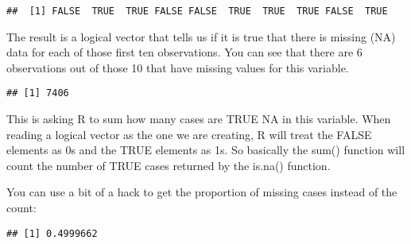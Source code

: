 \documentclass[
]{book}
\newenvironment{Shaded}{\begin{snugshade}}{\end{snugshade}}
\newcommand{\DecValTok}[1]{\textcolor[rgb]{0.00,0.00,0.81}{#1}}
\newcommand{\FunctionTok}[1]{\textcolor[rgb]{0.13,0.29,0.53}{\textbf{#1}}}
\newcommand{\NormalTok}[1]{#1}
\newcommand{\SpecialCharTok}[1]{\textcolor[rgb]{0.81,0.36,0.00}{\textbf{#1}}}
\begin{document}
\begin{Shaded}
\end{Shaded}

\begin{verbatim}
##  [1] FALSE  TRUE  TRUE FALSE FALSE  TRUE  TRUE  TRUE FALSE  TRUE
\end{verbatim}

The result is a logical vector that tells us if it is true that there is missing (NA) data for each of those first ten observations. You can see that there are 6 observations out of those 10 that have missing values for this variable.

\begin{Shaded}
\end{Shaded}

\begin{verbatim}
## [1] 7406
\end{verbatim}

This is asking R to sum how many cases are TRUE NA in this variable. When reading a logical vector as the one we are creating, R will treat the FALSE elements as 0s and the TRUE elements as 1s. So basically the sum() function will count the number of TRUE cases returned by the is.na() function.

You can use a bit of a hack to get the proportion of missing cases instead of the count:

\begin{Shaded}
\end{Shaded}

\begin{verbatim}
## [1] 0.4999662
\end{verbatim}
\end{document}
